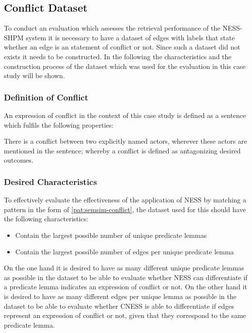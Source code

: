 \documentclass[11pt]{scrreprt}
\begin{document}
\subsection{Conflict Dataset}
To conduct an evaluation which assesses the retrieval performance of the NESS-SHPM system it is necessary to have a dataset of edges with labels that state whether an edge is an statement of conflict or not. Since such a dataset did not exists it needs to be constructed. In the following the characteristics and the construction process of the dataset which was used for the evaluation in this case study will be shown.

\subsubsection{Definition of Conflict}
An expression of conflict in the context of this case study is defined as a sentence which fulfils the following properties:

\begin{displayquote}
There is a conflict between two explicitly named actors, wherever these actors are mentioned in the sentence; whereby a conflict is defined as antagonizing desired outcomes.
\end{displayquote}

\subsubsection{Desired Characteristics}
\label{sec:dataset-characteristics}
To effectively evaluate the effectiveness of the application of NESS by matching a pattern in the form of \cref{pat:semsim-conflict}, the dataset used for this should have the following characteristics:

\begin{itemize}
	\item Contain the largest possible number of unique predicate lemmas
	\item Contain the largest possible number of edges per unique predicate lemma
\end{itemize}

On the one hand it is desired to have as many different unique predicate lemmas as possible in the dataset to be able to evaluate whether NESS can differentiate if a predicate lemma indicates an expression of conflict or not. On the other hand it is desired to have as many different edges per unique lemma as possible in the dataset to be able to evaluate whether CNESS is able to differentiate if edges represent an expression of conflict or not, given that they correspond to the same predicate lemma.
\end{document}

